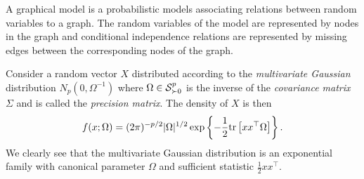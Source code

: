 A graphical model is a probabilistic models associating relations between random variables to a graph. The random variables of the model are represented by nodes in the graph and conditional independence relations are represented by missing edges between the corresponding nodes of the graph.

Consider a random vector $X$ distributed according to the \textit{multivariate Gaussian} distribution $N_p(0, \Omega^{-1})$ where $\Omega \in \S^p_{\succ 0}$ is the inverse of the \textit{covariance matrix} $\Sigma$ and is called the \textit{precision matrix}. The density of $X$ is then
\begin{equation} \label{eq-density-gaussian}
    f(x; \Omega) = (2\pi)^{-p/2} |\Omega|^{1/2} \expfc{-\frac{1}{2} \trB{xx^\top \Omega} }.
\end{equation}
We clearly see that the multivariate Gaussian distribution is an exponential family with canonical parameter $\Omega$ and sufficient statistic $\frac{1}{2}xx^\top$. 


